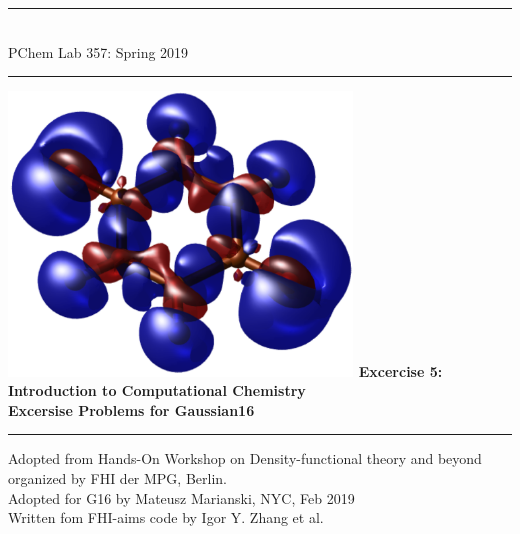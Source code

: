 \documentclass[nobib,nofonts,nols,nohyper]{tufte-handout}
\begin{document}

\thispagestyle{empty}
\begin{fullwidth}
  \begin{center}\huge\bfseries
    \rule{1.5\textwidth}{1pt}
    \\
    PChem Lab 357: Spring 2019 
    \\
    \vspace{0.5cm}
    \rule{1.5\textwidth}{1pt}
  \end{center}
  \vfill
  \begin{center}\LARGE\bfseries
    \includegraphics[height=7.55cm]{pics/cover.png}
    \vfill
    Excercise 5: Introduction to Computational Chemistry\\ 
    Excersise Problems for Gaussian16
  \end{center}
  \vfill
  \begin{center}\large\bfseries
    \rule{1.5\textwidth}{1pt}
    \vfill
    Adopted from Hands-On Workshop on Density-functional theory and beyond organized by FHI der MPG, Berlin.  \\
    Adopted for G16 by Mateusz Marianski, NYC, Feb 2019 \\ 
    Written fom FHI-aims code by Igor Y. Zhang et al.%
  \end{center}
\end{fullwidth}

\clearpage




%


%
\clearpage

\appendix
%

\vfill


%
%
\end{document}
